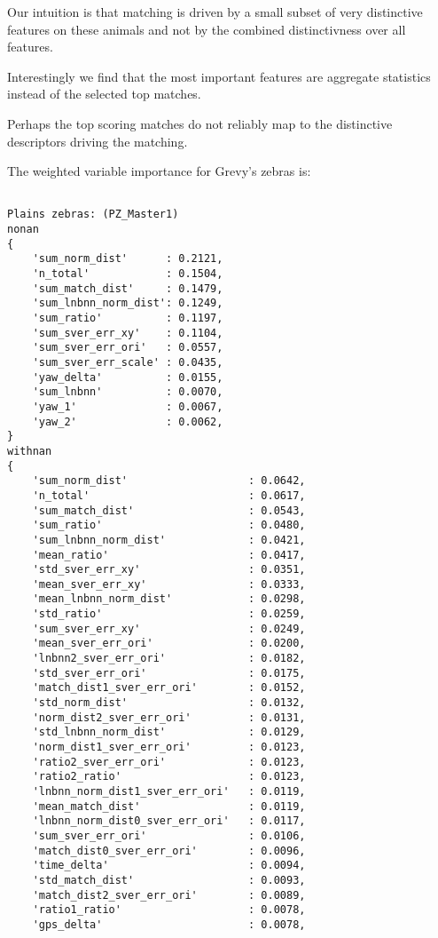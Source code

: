 Our intuition is that matching is driven by a small subset of very distinctive
  features on these animals and not by the combined distinctivness over all
  features.

Interestingly we find that the most important features are aggregate
  statistics instead of the selected top matches.

Perhaps the top scoring matches do not reliably map to the distinctive
descriptors driving the matching. 

The weighted variable importance for Grevy's zebras is: 
\begin{verbatim}

Plains zebras: (PZ_Master1)
nonan
{
    'sum_norm_dist'      : 0.2121,
    'n_total'            : 0.1504,
    'sum_match_dist'     : 0.1479,
    'sum_lnbnn_norm_dist': 0.1249,
    'sum_ratio'          : 0.1197,
    'sum_sver_err_xy'    : 0.1104,
    'sum_sver_err_ori'   : 0.0557,
    'sum_sver_err_scale' : 0.0435,
    'yaw_delta'          : 0.0155,
    'sum_lnbnn'          : 0.0070,
    'yaw_1'              : 0.0067,
    'yaw_2'              : 0.0062,
}
withnan
{
    'sum_norm_dist'                   : 0.0642,
    'n_total'                         : 0.0617,
    'sum_match_dist'                  : 0.0543,
    'sum_ratio'                       : 0.0480,
    'sum_lnbnn_norm_dist'             : 0.0421,
    'mean_ratio'                      : 0.0417,
    'std_sver_err_xy'                 : 0.0351,
    'mean_sver_err_xy'                : 0.0333,
    'mean_lnbnn_norm_dist'            : 0.0298,
    'std_ratio'                       : 0.0259,
    'sum_sver_err_xy'                 : 0.0249,
    'mean_sver_err_ori'               : 0.0200,
    'lnbnn2_sver_err_ori'             : 0.0182,
    'std_sver_err_ori'                : 0.0175,
    'match_dist1_sver_err_ori'        : 0.0152,
    'std_norm_dist'                   : 0.0132,
    'norm_dist2_sver_err_ori'         : 0.0131,
    'std_lnbnn_norm_dist'             : 0.0129,
    'norm_dist1_sver_err_ori'         : 0.0123,
    'ratio2_sver_err_ori'             : 0.0123,
    'ratio2_ratio'                    : 0.0123,
    'lnbnn_norm_dist1_sver_err_ori'   : 0.0119,
    'mean_match_dist'                 : 0.0119,
    'lnbnn_norm_dist0_sver_err_ori'   : 0.0117,
    'sum_sver_err_ori'                : 0.0106,
    'match_dist0_sver_err_ori'        : 0.0096,
    'time_delta'                      : 0.0094,
    'std_match_dist'                  : 0.0093,
    'match_dist2_sver_err_ori'        : 0.0089,
    'ratio1_ratio'                    : 0.0078,
    'gps_delta'                       : 0.0078,

\end{verbatim}
